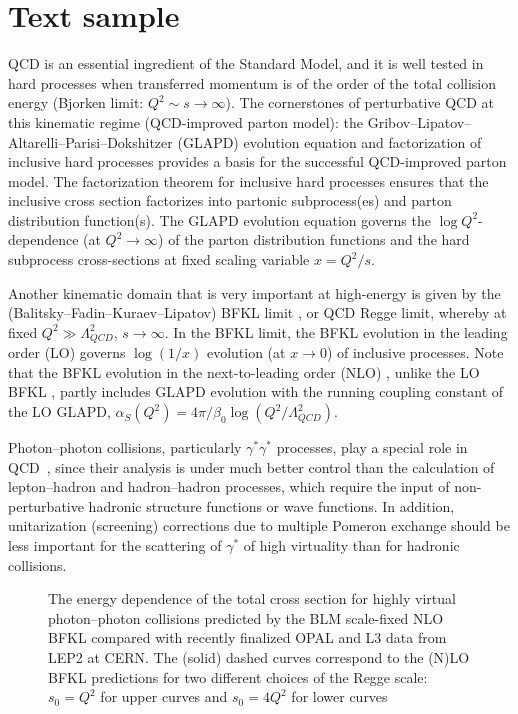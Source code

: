\documentclass{pic2012}
\begin{document}
\section{Text sample}
QCD is an essential ingredient of the Standard Model, and it is
well tested in  hard processes when transferred momentum is of the
order of the total collision energy (Bjorken limit: $Q^2 \sim s
\rightarrow \infty$). The cornerstones of perturbative QCD at this
kinematic regime (QCD-improved parton model):
 the Gribov--Lipatov--Altarelli--Parisi--Dokshitzer
(GLAPD) evolution equation and factorization of inclusive hard
processes provides a basis for the successful QCD-improved parton
model. The factorization theorem for inclusive hard processes
ensures that the inclusive cross section factorizes into partonic
subprocess(es) and parton distribution function(s). The GLAPD
evolution equation governs the $\log Q^2$-dependence (at $Q^2
\rightarrow \infty$) of the parton distribution functions and the
hard subprocess cross-sections at fixed scaling variable
$x=Q^2/s$.

Another kinematic domain that is very important at high-energy is
given by the (Balitsky--Fadin--Kuraev--Lipatov) BFKL limit
\cite{FKL,BL78}, or QCD Regge limit, whereby at fixed $Q^2 \gg
\Lambda_{QCD}^2$, $s \rightarrow \infty $. In the BFKL limit, the
BFKL evolution in the leading order (LO) governs $\log(1/x)$
evolution (at $x \rightarrow 0$) of inclusive processes. Note that
the BFKL evolution in the next-to-leading order (NLO)
\cite{FL,CC98,BFKLP}, unlike the LO BFKL \cite{FKL,BL78}, partly
includes GLAPD evolution with the running coupling constant of the
LO GLAPD, $\alpha_S(Q^2) = 4 \pi / \beta_0
\log(Q^2/\Lambda_{QCD}^2) $.

Photon--photon collisions, particularly $\gamma^* \gamma^*$
processes, play a special role in QCD~\cite{Budnev75}, since their
analysis is under much better control than the calculation of
lepton--hadron and hadron--hadron processes, which require the
input of non-perturbative hadronic structure functions or wave
functions.  In addition, unitarization (screening) corrections due
to multiple Pomeron exchange should be less important for the
scattering of $\gamma^*$ of high virtuality than for hadronic
collisions.

\begin{figure}[!thb]
\vspace*{7.0cm}
\begin{center}
\caption[*]{ The energy dependence of the total cross section for
highly virtual photon--photon collisions predicted by the BLM
scale-fixed NLO BFKL \cite{BFKLP2} compared with recently
finalized OPAL \cite{OPAL} and L3 \cite{L3} data from LEP2 at
CERN. The (solid) dashed curves correspond to the (N)LO BFKL
predictions for two different choices of the Regge scale: $s_0=
Q^2$  for upper curves and $s_0=4 Q^2$ for lower curves}
\end{center}
\end{figure}
\end{document}

